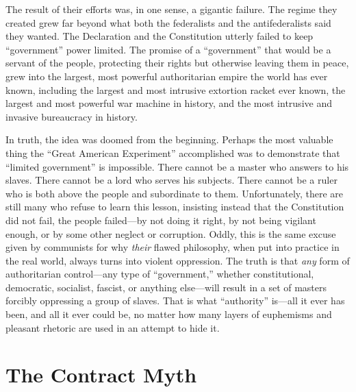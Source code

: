 \documentclass{book}
\begin{document}
The result of their efforts was, in one sense, a gigantic failure. The regime they created grew far beyond what both the federalists and the antifederalists said they wanted. The Declaration and the Constitution utterly failed to keep \enquote{government} power limited. The promise of a \enquote{government} that would be a servant of the people, protecting their rights but otherwise leaving them in peace, grew into the largest, most powerful authoritarian empire the world has ever known, including the largest and most intrusive extortion racket ever known, the largest and most powerful war machine in history, and the most intrusive and invasive bureaucracy in history.

In truth, the idea was doomed from the beginning. Perhaps the most valuable thing the \enquote{Great American Experiment} accomplished was to demonstrate that \enquote{limited government} is impossible. There cannot be a master who answers to his slaves. There cannot be a lord who serves his subjects. There cannot be a ruler who is both above the people and subordinate to them. Unfortunately, there are still many who refuse to learn this lesson, insisting instead that the Constitution did not fail, the people failed---by not doing it right, by not being vigilant enough, or by some other neglect or corruption. Oddly, this is the same excuse given by communists for why \emph{their} flawed philosophy, when put into practice in the real world, always turns into violent oppression. The truth is that \emph{any} form of authoritarian control---any type of \enquote{government,} whether constitutional, democratic, socialist, fascist, or anything else---will result in a set of masters forcibly oppressing a group of slaves. That is what \enquote{authority} is---all it ever has been, and all it ever could be, no matter how many layers of euphemisms and pleasant rhetoric are used in an attempt to hide it.

\section{The Contract Myth}
\end{document}

